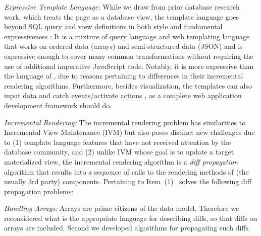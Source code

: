 \begin{compact_item}
\item \textit{Expressive Template Language:} While we draw from prior database research work, which treats the page as a database view, the template language goes beyond SQL query and view definitions in both style and fundamental expressiveness : It is a mixture of query language and web templating language that works on ordered data (arrays) and semi-structured data (JSON) and is expressive enough to cover many common transformations without requiring the use of additional imperative JavaScript code. Notably, it is more expressive than the language of \angular, due to reasons pertaining to differences in their incremental rendering algorithms.   Furthermore, besides visualization, the templates can also input data and catch events/activate actions , as a complete web application development framework should do.

%
\item \textit{Incremental Rendering:} The incremental rendering problem has similarities to Incremental View Maintenance (IVM) but also poses distinct new challenges due to (1) template language features that have not received attention by the database community, and (2) unlike IVM whose goal is to update a target materialized view, the incremental rendering algorithm is a \textit{diff propagation} algorithm that results into a sequence of calls to the rendering methods of (the usually 3rd party) components.  Pertaining to Item~(1) \projname\ solves the following diff propagation problems:
\begin{compact_enum}
\item \textit{Handling Arrays:} Arrays are prime citizens of the data model. Therefore we reconsidered what is the appropriate language for describing diffs, so that diffs on arrays are included. Second we developed algorithms for propagating such diffs.   
%



\end{compact_enum}
\end{compact_item}
